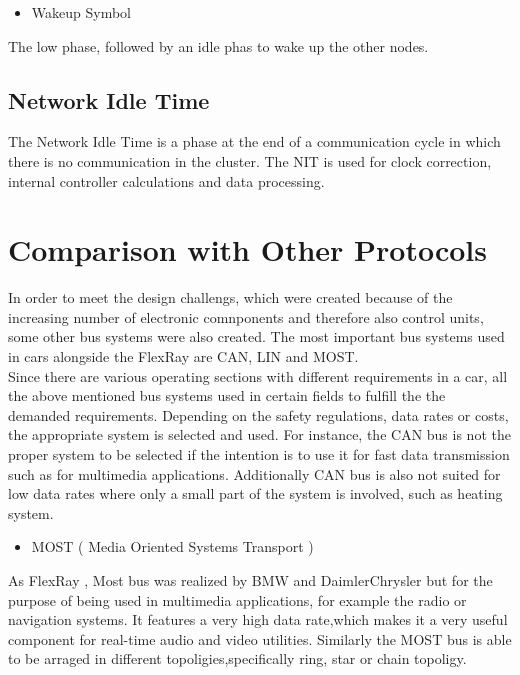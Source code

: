 \documentclass[conference]{IEEEtran}
\begin{document}
\begin{itemize}
  \item Wakeup Symbol
\end{itemize}
The low phase, followed by an idle phas to wake up the other nodes.

\subsection{Network Idle Time}
The Network Idle Time is a phase at the end of a communication cycle in which there is no communication in the cluster. The NIT is used for clock correction, internal controller calculations and data processing.

\section*{Comparison with Other Protocols}

In order to meet the design challengs, which were created because of the increasing number of electronic comnponents and therefore also control units, some other bus systems were also created. The most important bus systems used in cars alongside the FlexRay are CAN, LIN and MOST.\\

Since there are various operating sections with different requirements in a car, all the above mentioned  bus systems used in certain fields to fulfill the the demanded requirements. Depending on the safety regulations, data rates or costs, the appropriate system is selected and used. For instance, the CAN bus is not the proper system to be selected if the intention is to use it for fast data transmission such as for multimedia applications. Additionally CAN bus is also not suited for low data rates where only a small part of the system is involved, such as heating system.\\

\begin{itemize}
  \item MOST ( Media Oriented Systems Transport )
\end{itemize}
As FlexRay , Most bus was realized by BMW and DaimlerChrysler but for the purpose of being used in multimedia applications, for example the radio or navigation systems. It features a very high data rate,which makes it a very useful component for real-time audio and video utilities. Similarly the MOST bus is able to be arraged in different topoligies,specifically ring, star or chain topoligy.\\
\end{document}
